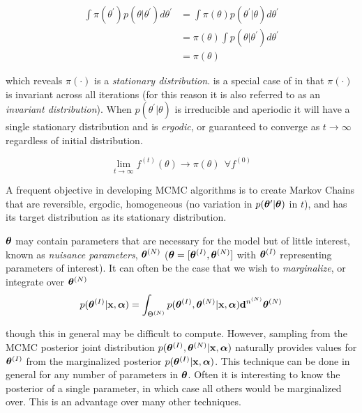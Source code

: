\begin{equation}
\begin{aligned}
\int \pi (\theta^{\prime}) p(\theta|\theta^{\prime}) d\theta^{\prime} &=
\int \pi (\theta) p(\theta^{\prime}|\theta) d\theta^{\prime} \\
&= \pi (\theta) \int p(\theta|\theta^{\prime}) d\theta^{\prime} \\
&= \pi (\theta)
\end{aligned}
\label{eq:er_nr_calibrations_parameter_determ_mcmc_stationary}
\end{equation}

\noindent which reveals $\pi (\cdot)$ is a
\textit{stationary distribution}.   is a special case of
 in that $\pi( \cdot )$ is invariant across all iterations (for this reason
it is also referred to as an \textit{invariant distribution}).  When $p(\theta^{\prime}|\theta)$ is irreducible and
aperiodic it will have a single stationary distribution and is \textit{ergodic}, or guaranteed to converge as
$t \rightarrow \infty$ regardless of initial distribution.

\begin{equation}
\lim_{t \rightarrow \infty} f^{(t)}(\theta) \rightarrow \pi (\theta)\ \ \forall f^{(0)}
\label{eq:er_nr_calibrations_parameter_determ_mcmc_converge}
\end{equation}

A frequent objective in developing MCMC algorithms is to create Markov Chains that are reversible, ergodic, homogeneous
(no variation in $p(\boldsymbol{\theta}^{\prime}|\boldsymbol{\theta})$ in $t$), and has its target distribution as its stationary distribution.

$\boldsymbol{\theta}$ may contain parameters that are necessary for the model but of little interest,
known as \textit{nuisance parameters}, $\boldsymbol{\theta}^{(N)}$ ($\boldsymbol{\theta} = [\boldsymbol{\theta}^{(I)}, \boldsymbol{\theta}^{(N)}]$ with
$\boldsymbol{\theta}^{(I)}$ representing parameters of interest).  It can often be the case that we wish to \textit{marginalize}, or integrate
over $\boldsymbol{\theta}^{(N)}$
\begin{equation}
p(\boldsymbol{\theta}^{(I)}|\mathbf{x}, \boldsymbol{\alpha}) = \int_{\Theta^{(N)}}
p(\boldsymbol{\theta}^{(I)}, \boldsymbol{\theta}^{(N)}|\mathbf{x}, \boldsymbol{\alpha}) \mathbf{d}^{n^{(N)}}\boldsymbol{\theta}^{(N)}
\end{equation}

\noindent though this in general may be difficult to compute.  However, sampling from the MCMC posterior joint distribution
$p(\boldsymbol{\theta}^{(I)}, \boldsymbol{\theta}^{(N)}|\mathbf{x}, \boldsymbol{\alpha})$ naturally provides values for $\boldsymbol{\theta}^{(I)}$ from the
marginalized posterior $p(\boldsymbol{\theta}^{(I)}|\mathbf{x}, \boldsymbol{\alpha})$.  This technique can be done in general for any number of
parameters in $\boldsymbol{\theta}$.  Often it is interesting to know the posterior of a single parameter, in which case all others would
be marginalized over.  This is an advantage over many other techniques.

